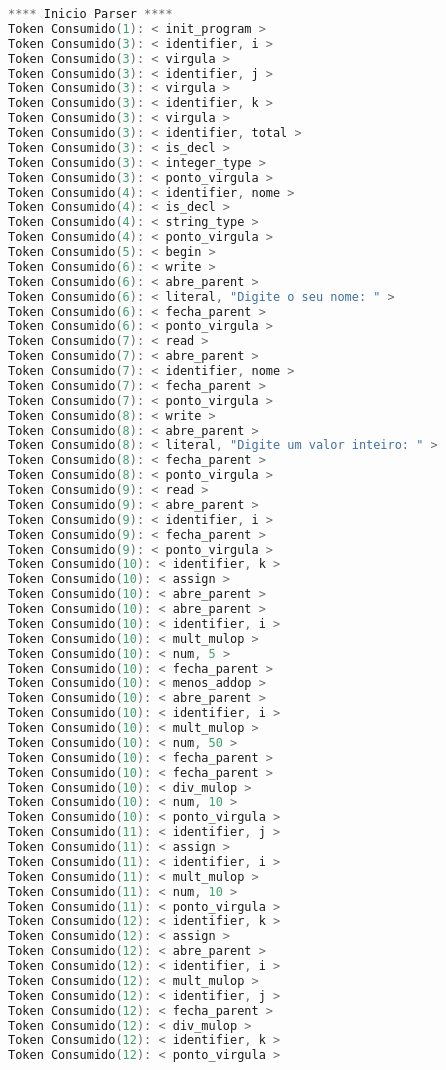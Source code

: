\begin{lstlisting}[caption={Saida Correta para o Codigo de teste  : Teste5.txt},label={Entrada 1},language=C]
**** Inicio Parser ****
Token Consumido(1): < init_program >
Token Consumido(3): < identifier, i >
Token Consumido(3): < virgula >
Token Consumido(3): < identifier, j >
Token Consumido(3): < virgula >
Token Consumido(3): < identifier, k >
Token Consumido(3): < virgula >
Token Consumido(3): < identifier, total >
Token Consumido(3): < is_decl >
Token Consumido(3): < integer_type >
Token Consumido(3): < ponto_virgula >
Token Consumido(4): < identifier, nome >
Token Consumido(4): < is_decl >
Token Consumido(4): < string_type >
Token Consumido(4): < ponto_virgula >
Token Consumido(5): < begin >
Token Consumido(6): < write >
Token Consumido(6): < abre_parent >
Token Consumido(6): < literal, "Digite o seu nome: " >
Token Consumido(6): < fecha_parent >
Token Consumido(6): < ponto_virgula >
Token Consumido(7): < read >
Token Consumido(7): < abre_parent >
Token Consumido(7): < identifier, nome >
Token Consumido(7): < fecha_parent >
Token Consumido(7): < ponto_virgula >
Token Consumido(8): < write >
Token Consumido(8): < abre_parent >
Token Consumido(8): < literal, "Digite um valor inteiro: " >
Token Consumido(8): < fecha_parent >
Token Consumido(8): < ponto_virgula >
Token Consumido(9): < read >
Token Consumido(9): < abre_parent >
Token Consumido(9): < identifier, i >
Token Consumido(9): < fecha_parent >
Token Consumido(9): < ponto_virgula >
Token Consumido(10): < identifier, k >
Token Consumido(10): < assign >
Token Consumido(10): < abre_parent >
Token Consumido(10): < abre_parent >
Token Consumido(10): < identifier, i >
Token Consumido(10): < mult_mulop >
Token Consumido(10): < num, 5 >
Token Consumido(10): < fecha_parent >
Token Consumido(10): < menos_addop >
Token Consumido(10): < abre_parent >
Token Consumido(10): < identifier, i >
Token Consumido(10): < mult_mulop >
Token Consumido(10): < num, 50 >
Token Consumido(10): < fecha_parent >
Token Consumido(10): < fecha_parent >
Token Consumido(10): < div_mulop >
Token Consumido(10): < num, 10 >
Token Consumido(10): < ponto_virgula >
Token Consumido(11): < identifier, j >
Token Consumido(11): < assign >
Token Consumido(11): < identifier, i >
Token Consumido(11): < mult_mulop >
Token Consumido(11): < num, 10 >
Token Consumido(11): < ponto_virgula >
Token Consumido(12): < identifier, k >
Token Consumido(12): < assign >
Token Consumido(12): < abre_parent >
Token Consumido(12): < identifier, i >
Token Consumido(12): < mult_mulop >
Token Consumido(12): < identifier, j >
Token Consumido(12): < fecha_parent >
Token Consumido(12): < div_mulop >
Token Consumido(12): < identifier, k >
Token Consumido(12): < ponto_virgula >

\end{lstlisting}
